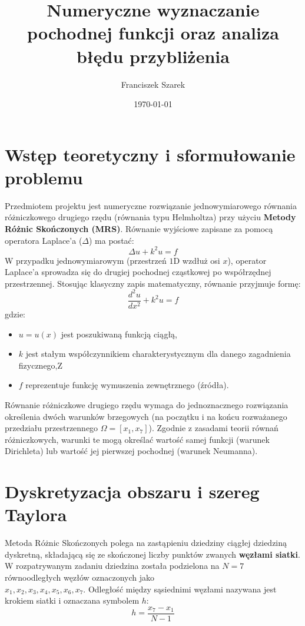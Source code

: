 \documentclass[a4paper,14pt]{scrartcl}
\title{Numeryczne wyznaczanie pochodnej funkcji oraz analiza błędu przybliżenia}
\author{Franciszek Szarek}
\date{\today}
\begin{document}
\maketitle

\tableofcontents
\newpage


\section{Wstęp teoretyczny i sformułowanie problemu}
Przedmiotem projektu jest numeryczne rozwiązanie jednowymiarowego równania różniczkowego drugiego rzędu (równania typu Helmholtza) przy użyciu \textbf{Metody Różnic Skończonych (MRS)}. Równanie wyjściowe zapisane za pomocą operatora Laplace'a ($\Delta$) ma postać:
\begin{equation}
    \Delta u + k^2 u = f
\end{equation}
W przypadku jednowymiarowym (przestrzeń $1\text{D}$ wzdłuż osi $x$), operator Laplace'a sprowadza się do drugiej pochodnej cząstkowej po współrzędnej przestrzennej. Stosując klasyczny zapis matematyczny, równanie przyjmuje formę:
\begin{equation}
    \frac{d^2u}{dx^2} + k^2 u = f
\end{equation}
gdzie:
\begin{itemize}
    \item $u = u(x)$ jest poszukiwaną funkcją ciągłą,
    \item $k$ jest stałym współczynnikiem charakterystycznym dla danego zagadnienia fizycznego,Z
    \item $f$ reprezentuje funkcję wymuszenia zewnętrznego (źródła).
\end{itemize}

Równanie różniczkowe drugiego rzędu wymaga do jednoznacznego rozwiązania określenia dwóch warunków brzegowych (na początku i na końcu rozważanego przedziału przestrzennego $\Omega = [x_1, x_7]$). Zgodnie z zasadami teorii równań różniczkowych, warunki te mogą określać wartość samej funkcji (warunek Dirichleta) lub wartość jej pierwszej pochodnej (warunek Neumanna).

\section{Dyskretyzacja obszaru i szereg Taylora}
Metoda Różnic Skończonych polega na zastąpieniu dziedziny ciągłej dziedziną dyskretną, składającą się ze skończonej liczby punktów zwanych \textbf{węzłami siatki}. W rozpatrywanym zadaniu dziedzina została podzielona na $N = 7$ równoodległych węzłów oznaczonych jako
\\
$x_1, x_2, x_3, x_4, x_5, x_6, x_7$.
Odległość między sąsiednimi węzłami nazywana jest krokiem siatki i oznaczana symbolem $h$:
\begin{equation}
    h = \frac{x_7 - x_1}{N - 1}
\end{equation}
\end{document}
